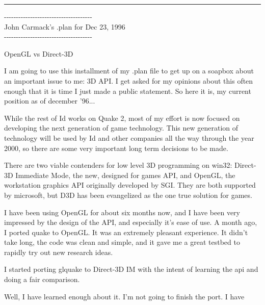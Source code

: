 \label{openglvsdirectd}
\hrule \par \bigskip
\newenvironment{allintypewriter}{\ttfamily}{\par}
\begin{allintypewriter}
{-}{-}{-}{-}{-}{-}{-}{-}{-}{-}{-}{-}{-}{-}{-}{-}{-}{-}{-}{-}{-}{-}{-}{-}{-}{-}{-}{-}{-}{-}{-}{-}{-}{-}{-}{-}{-}\\
John Carmack's .plan for Dec 23, 1996\\
{-}{-}{-}{-}{-}{-}{-}{-}{-}{-}{-}{-}{-}{-}{-}{-}{-}{-}{-}{-}{-}{-}{-}{-}{-}{-}{-}{-}{-}{-}{-}{-}{-}{-}{-}{-}{-}\\
\par
OpenGL vs Direct-3D\\
\par
I am going to use this installment of my .plan file to get up on a soapbox
about an important issue to me: 3D API. I get asked for my opinions about
this often enough that it is time I just made a public statement. So here
it is, my current position as of december '96...\\ 
\par
While the rest of Id works on Quake 2, most of my effort is now focused on
developing the next generation of game technology. This new generation of
technology will be used by Id and other companies all the way through the
year 2000, so there are some very important long term decisions to be made.\\ 
\par
There are two viable contenders for low level 3D programming on win32: 
Direct-3D Immediate Mode, the new, designed for games API, and OpenGL, the
workstation graphics API originally developed by SGI. They are both 
supported by microsoft, but D3D has been evangelized as the one true solution
for games.\\ 
\par
I have been using OpenGL for about six months now, and I have been very 
impressed by the design of the API, and especially it's ease of use. A month
ago, I ported quake to OpenGL. It was an extremely pleasant experience. It 
didn't take long, the code was clean and simple, and it gave me a great testbed
to rapidly try out new research ideas.\\ 
\par
I started porting glquake to Direct-3D IM with the intent of learning the api
and doing a fair comparison.\\ 
\par
Well, I have learned enough about it. I'm not going to finish the port. I have

\end{allintypewriter}
